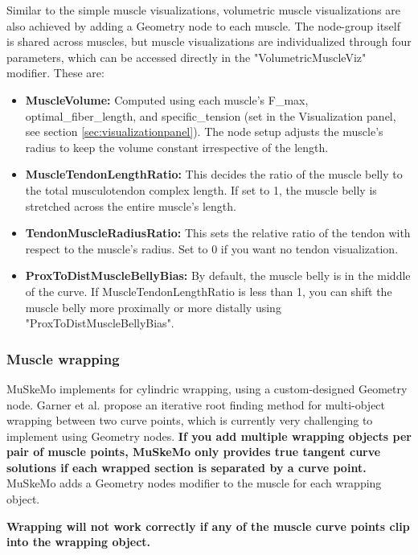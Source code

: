 \documentclass{article}
\begin{document}
Similar to the simple muscle visualizations, volumetric muscle visualizations are also achieved by adding a Geometry node to each muscle. The node-group itself is shared across muscles, but muscle visualizations are individualized through four parameters, which can be accessed directly in the "VolumetricMuscleViz" modifier. These are:

\begin{itemize}
\item \textbf{MuscleVolume:} Computed using each muscle's F\_max, optimal\_fiber\_length, and specific\_tension (set in the Visualization panel, see section \ref{sec:visualizationpanel}). The node setup adjusts the muscle's radius to keep the volume constant irrespective of the length.
\item \textbf{MuscleTendonLengthRatio: } This decides the ratio of the muscle belly to the total musculotendon complex length. If set to 1, the muscle belly is stretched across the entire muscle's length. 
\item \textbf{TendonMuscleRadiusRatio: } This sets the relative ratio of the tendon with respect to the muscle's radius. Set to 0 if you want no tendon visualization.
\item \textbf{ProxToDistMuscleBellyBias: } By default, the muscle belly is in the middle of the curve. If MuscleTendonLengthRatio is less than 1, you can shift the muscle belly more proximally or more distally using "ProxToDistMuscleBellyBias".
\end{itemize}


\subsubsection{Muscle wrapping}
\label{sec:musclewrapping}

MuSkeMo implements \cite{garnerObstacleSetMethodRepresenting2000} for cylindric wrapping, using a custom-designed Geometry node. Garner et al. \cite{garnerObstacleSetMethodRepresenting2000} propose an iterative root finding method for multi-object wrapping between two curve points, which is currently very challenging to implement using Geometry nodes. \textbf{If you add multiple wrapping objects per pair of muscle points, MuSkeMo only provides true tangent curve solutions if each wrapped section is separated by a curve point.} MuSkeMo adds a Geometry nodes modifier to the muscle for each wrapping object.

\textbf{Wrapping will not work correctly if any of the muscle curve points clip into the wrapping object.}
\end{document}
